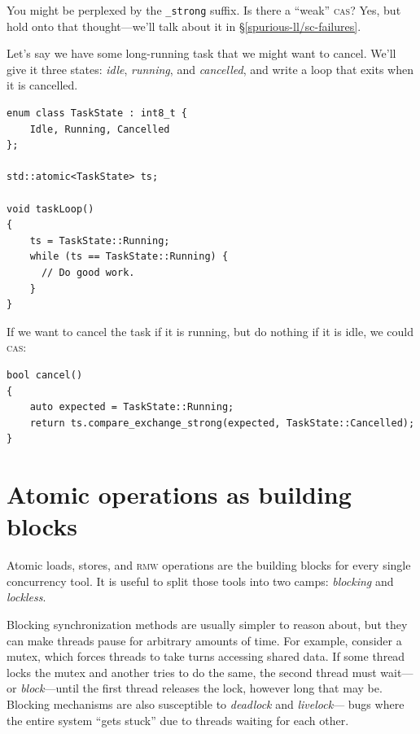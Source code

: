 \documentclass[fontsize=10pt, oneside]{scrartcl}
\newcommand{\codesize}{\fontsize{\bodyfontsize}{\bodybaselineskip}}
\newcommand{\introduce}[1]{\textit{#1}}
\newcommand{\secref}[1]{\hyperref[#1]{\textsc{\S}\ref*{#1}}}
\newenvironment{colfigure}
  {\par\vspace{1\baselineskip minus 0.5\baselineskip}\noindent\minipage{\linewidth}}
  {\endminipage\vspace{1\baselineskip minus 0.7\baselineskip}}
\begin{document}
\begin{samepage}
\noindent You might be perplexed by the \texttt{\_strong} suffix.
Is there a ``weak'' \textsc{cas}?
Yes, but hold onto that thought---we'll talk about it in \secref{spurious-ll/sc-failures}.
\end{samepage}

Let's say we have some long-running task that we might want to cancel.
We'll give it three states: \textit{idle}, \textit{running},
and \textit{cancelled}, and write a loop that exits when it is cancelled.
\begin{colfigure}
\begin{verbatim}
enum class TaskState : int8_t {
    Idle, Running, Cancelled
};

std::atomic<TaskState> ts;

void taskLoop()
{
    ts = TaskState::Running;
    while (ts == TaskState::Running) {
      // Do good work.
    }
}
\end{verbatim}
\end{colfigure}
If we want to cancel the task if it is running, but do nothing if it is idle,
we could \textsc{cas}:
\begin{colfigure}
\begin{verbatim}
bool cancel()
{
    auto expected = TaskState::Running;
    return ts.compare_exchange_strong(expected, TaskState::Cancelled);
}
\end{verbatim}
\end{colfigure}

\section{Atomic operations as building blocks}

Atomic loads, stores, and \textsc{rmw} operations are the building blocks for every single concurrency tool.
It is useful to split those tools into two camps:
\introduce{blocking} and \introduce{lockless}.

Blocking synchronization methods are usually simpler to reason about,
but they can make threads pause for arbitrary amounts of time.
For example, consider a mutex,
which forces threads to take turns accessing shared data.
If some thread locks the mutex and another tries to do the same,
the second thread must wait---or \introduce{block}---until the first thread releases the lock,
however long that may be.
Blocking mechanisms are also susceptible to \introduce{deadlock} and \introduce{livelock}---
bugs where the entire system ``gets stuck'' due to threads waiting for each other.
\end{document}
